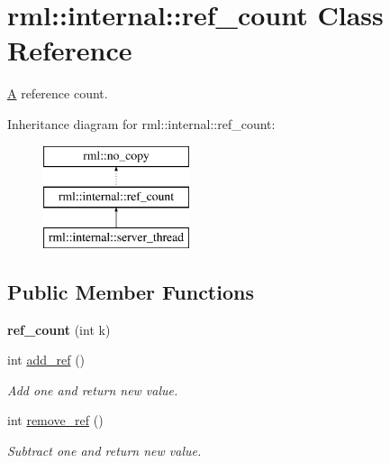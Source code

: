 \hypertarget{classrml_1_1internal_1_1ref__count}{}\section{rml\+:\+:internal\+:\+:ref\+\_\+count Class Reference}
\label{classrml_1_1internal_1_1ref__count}


\hyperlink{structA}{A} reference count.  


Inheritance diagram for rml\+:\+:internal\+:\+:ref\+\_\+count\+:\begin{figure}[H]
\begin{center}
\leavevmode
\includegraphics[height=3.000000cm]{classrml_1_1internal_1_1ref__count}
\end{center}
\end{figure}
\subsection*{Public Member Functions}
\begin{DoxyCompactItemize}
\item 
\hypertarget{classrml_1_1internal_1_1ref__count_a4b92246e7f3e8ce41038e5abd98e209d}{}{\bfseries ref\+\_\+count} (int k)\label{classrml_1_1internal_1_1ref__count_a4b92246e7f3e8ce41038e5abd98e209d}

\item 
\hypertarget{classrml_1_1internal_1_1ref__count_a418c6b673807bb79d211c7d284366952}{}int \hyperlink{classrml_1_1internal_1_1ref__count_a418c6b673807bb79d211c7d284366952}{add\+\_\+ref} ()\label{classrml_1_1internal_1_1ref__count_a418c6b673807bb79d211c7d284366952}

\begin{DoxyCompactList}\small\item\em Add one and return new value. \end{DoxyCompactList}\item 
\hypertarget{classrml_1_1internal_1_1ref__count_a1cb00c41199e15b1c1ca3c3ca9bdb7f2}{}int \hyperlink{classrml_1_1internal_1_1ref__count_a1cb00c41199e15b1c1ca3c3ca9bdb7f2}{remove\+\_\+ref} ()\label{classrml_1_1internal_1_1ref__count_a1cb00c41199e15b1c1ca3c3ca9bdb7f2}

\begin{DoxyCompactList}\small\item\em Subtract one and return new value. \end{DoxyCompactList}\end{DoxyCompactItemize}
